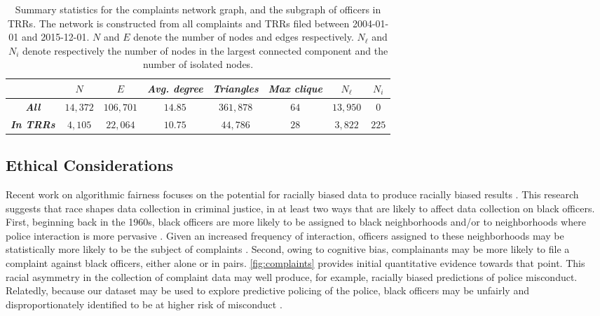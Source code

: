 \begin{table}[t!]
	\begin{center}
\caption{Summary statistics for the complaints network graph, and the subgraph
of officers in TRRs. The network is constructed from all complaints and TRRs filed between 
2004-01-01 and 2015-12-01. $N$ and $E$ denote the number of nodes and edges respectively. $N_\ell$ and $N_i$ denote respectively the number of nodes in the largest connected component and the number of isolated nodes.}\label{tab:network}
\vspace{0.5em}
\begin{tabular}{c|c|c|c|c|c|c|c|}
\cline{2-8}
                                                & $N$ & $E$ & \textit{Avg. degree} & \textit{Triangles} & \textit{Max clique} & $N_\ell$ & $N_i$ \\ \hline
\multicolumn{1}{|c|}{\textit{\textbf{All}}}     & $14{,}372$      & $106{,}701$     & $14.85$              & $361{,}878$        & $64$                & $13{,}950$   & $0$                   \\ \hline
\multicolumn{1}{|c|}{\textit{\textbf{In TRRs}}} & $4{,}105$       & $22{,}064$      & $10.75$              & $44{,}786$         & $28$                & $3{,}822$    & $225$                 \\ \hline
\end{tabular} \label{tab:stats_graphs}
	\end{center}
\end{table}

\subsection{Ethical Considerations}
Recent work on algorithmic fairness focuses on the potential for racially
biased data to produce racially biased results
\cite{veale2018fairness,sloane2019ai,d2020fairness}.  This research suggests
that race shapes data collection in criminal justice, in at least two ways that
are likely to affect data collection on black officers. First, beginning back
in the 1960s, black officers are more likely to be assigned to black
neighborhoods and/or to neighborhoods where police interaction is more
pervasive \cite{Kuykendall80}. Given an increased frequency of interaction,
officers assigned to these neighborhoods may be statistically more likely to be
the subject of complaints \cite{Kane06}.  Second, owing to cognitive bias, complainants 
may be more likely to file a complaint against black officers, either alone or in pairs.
\cref{fig:complaints} provides initial quantitative evidence towards that point. This racial
asymmetry in the collection of complaint data may well produce, for example,
racially biased predictions of police misconduct. Relatedly, because our
dataset may be used to explore predictive policing of the police, black
officers may be unfairly and disproportionately identified to be at higher risk
of misconduct \cite{veale2018fairness,sloane2019ai,d2020fairness,Wood19}. 

